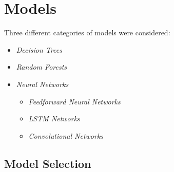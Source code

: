 \section{Models}
Three different categories of models were
considered:
\begin{itemize}
    \item \it{Decision Trees}
    \item \it{Random Forests}
    \item \it{Neural Networks}
    \begin{itemize}
        \item \it{Feedforward Neural Networks}
        \item \it{LSTM Networks}
        \item \it{Convolutional Networks}
    \end{itemize}
\end{itemize}
\subsection{Model Selection}
